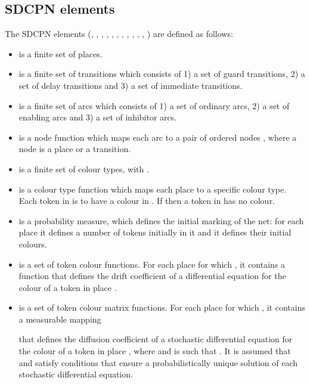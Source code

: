 \documentclass[copyright,creativecommons]{eptcs}
\begin{document}
\subsection{SDCPN elements}
The SDCPN elements (, , ,
, , , , , , , , ) are defined as follows:
\begin{itemize}
\item  is a finite set of places.

\item  is a finite set of transitions which consists
      of 1) a set  of guard transitions, 2) a set  of delay
      transitions and 3) a set  of immediate transitions.

\item  is a finite set of arcs which consists
      of 1) a set  of ordinary arcs, 2) a set  of
      enabling arcs and 3) a set  of inhibitor arcs.

\item  is a node function which maps each arc  to
      a pair of ordered nodes , where a node is a place or a
      transition.

\item 
      is a finite set of colour types, with .

\item  is a colour type function which maps
      each place  to a specific colour type.
      Each token in  is to have a colour in . If  then a token in  has no colour.

\item  is a probability measure,
      which defines the initial marking of the net:
      for each place it defines a number  of tokens
      initially in it and it defines their initial colours.

\item  is a set of token colour functions. For each place
       for which , it
      contains a function  that defines the drift coefficient of a
      differential equation for the colour of a token in place .

\item  is a set of token colour matrix functions.
      For each place  for which , it contains a measurable mapping
      
      that defines the diffusion coefficient of a stochastic
      differential equation for the colour of a token in place ,
      where  and  is such that .
      It is assumed
      that  and  satisfy
      conditions that ensure a probabilistically unique solution of
      each stochastic differential equation.


\end{itemize}
\end{document}
